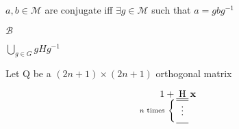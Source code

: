 \documentclass{article}
\newcommand*\tensordim[2]{
 \underset{
  \mathllap{\text{\(#2\) times}
  \ \left\{
   \vphantom{
    \begin{array}{r}
     \hline \hline \vdots \\[1ex] \hline
    \end{array}
   } \right.
  }
  \begin{array}{r}
   \hline \hline \vdots \\[1ex] \hline
  \end{array}
 }
 {\mathrm #1}
}
\begin{document}
\(a, b \in \mathcal M\) are conjugate iff \(\mathop\exists g \in \mathcal M\) such that \(a = g b g^{-1}\)

\(\mathscr B\)

\(\bigcup\limits_{g \in G} g H g^{-1}\)

Let Q be a \((2n+1)\times(2n+1)\) orthogonal matrix

\begin{equation*}
 1 + \tensordim{H}{n} \,\mathbf x
\end{equation*}
\end{document}
